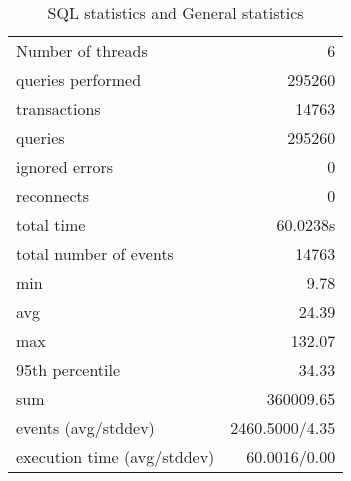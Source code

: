 \documentclass[11pt]{article}
\begin{document}
\begin{table}[h!]
\centering
\begin{tabular}{ l r }
\hline
Number of threads & 6 \\
queries performed & 295260 \\
transactions & 14763 \\
queries & 295260 \\
ignored errors & 0 \\
reconnects & 0 \\
total time & 60.0238s \\
total number of events & 14763 \\
min & 9.78 \\
avg & 24.39 \\
max & 132.07 \\
95th percentile & 34.33 \\
sum & 360009.65 \\
events (avg/stddev) & 2460.5000/4.35 \\
execution time (avg/stddev) & 60.0016/0.00 \\
\hline
\end{tabular}
\caption{SQL statistics and General statistics}
\label{tab:table1}
\end{table}
\end{document}
